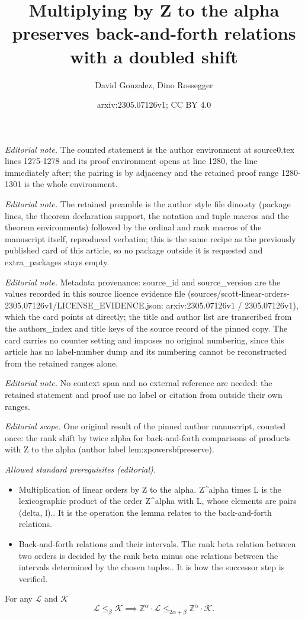 \documentclass[10pt,a4paper]{amsart}
\title{Multiplying by Z to the alpha preserves back-and-forth relations with a doubled shift}
\author{David Gonzalez, Dino Rossegger}
\date{arxiv:2305.07126v1; CC BY 4.0}
\providecommand{\L}{\mathcal{L}}
\newcommand{\Z}{\mathbb{Z}}
\newcommand{\K}{\mathcal{K}}
\renewcommand{\L}{\mathcal{L}}
\begin{document}
\maketitle
\noindent\textit{Editorial note.} The counted statement is the author environment at source0.tex lines 1275-1278 and its proof environment opens at line 1280, the line immediately after; the pairing is by adjacency and the retained proof range 1280-1301 is the whole environment.\par\medskip
\noindent\textit{Editorial note.} The retained preamble is the author style file dino.sty (package lines, the theorem declaration support, the notation and tuple macros and the theorem environments) followed by the ordinal and rank macros of the manuscript itself, reproduced verbatim; this is the same recipe as the previously published card of this article, so no package outside it is requested and extra\_packages stays empty.\par\medskip
\noindent\textit{Editorial note.} Metadata provenance: source\_id and source\_version are the values recorded in this source licence evidence file (sources/scott-linear-orders-2305.07126v1/LICENSE\_EVIDENCE.json: arxiv:2305.07126v1 / 2305.07126v1), which the card points at directly; the title and author list are transcribed from the authors\_index and title keys of the source record of the pinned copy. The card carries no counter setting and imposes no original numbering, since this article has no label-number dump and its numbering cannot be reconstructed from the retained ranges alone.\par\medskip
\noindent\textit{Editorial note.} No context span and no external reference are needed: the retained statement and proof use no label or citation from outside their own ranges.\par\medskip
\noindent\textit{Editorial scope.} One original result of the pinned author manuscript, counted once: the rank shift by twice alpha for back-and-forth comparisons of products with Z to the alpha (author label lem:zpowersbfpreserve).\par\medskip
\noindent\textit{Allowed standard prerequisites (editorial).}\begin{itemize}
\item Multiplication of linear orders by Z to the alpha. Z\textasciicircum{}alpha times L is the lexicographic product of the order Z\textasciicircum{}alpha with L, whose elements are pairs (delta, l).. It is the operation the lemma relates to the back-and-forth relations.
\item Back-and-forth relations and their intervals. The rank beta relation between two orders is decided by the rank beta minus one relations between the intervals determined by the chosen tuples.. It is how the successor step is verified.
\end{itemize}\medskip
\begin{lemma}\label{lem:zpowersbfpreserve}
For any $\L$ and $\K$
$$\L\leq_\beta \K\implies \Z^\alpha\cdot \L\leq_{2\alpha+\beta} \Z^\alpha\cdot \K.$$
\end{lemma}
\end{document}
